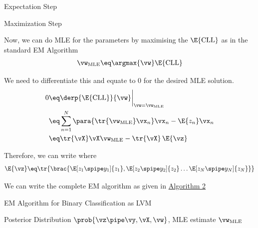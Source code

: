 \documentclass{article}
\begin{document}
\begin{question}
\begin{qsubsection}{Expectation Step}
	\end{qsubsection}

	\begin{qsubsection}{Maximization Step}

		Now, we can do MLE for the parameters by maximising the $\E{\text{CLL}}$ as in the standard EM Algorithm
		\begin{align*}
			\vw_{\text{MLE}}	&\eq	\argmax{\vw} \E{\text{CLL}} \\
		\end{align*}

		We need to differentiate this and equate to 0 for the desired MLE solution.
		\begin{align*}
			0	&\eq	\derp{\E{\text{CLL}}}{\vw} \bigg|_{\vw = \vw_{\text{MLE}}} \\
			&\eq	\sum_{n = 1}^N \para{\tr{\vw_{\text{MLE}}} \vx_n} \vx_n - \E{z_n} \vx_n \\
			&\eq	\tr{\vX} \vX \vw_{\text{MLE}} - \tr{\vX}\,\E{\vz}
		\end{align*}

		Therefore, we can write
		where
		\begin{align*}
			\E{\vz}	\eq \tr{\brac{\E[z_1 \spipe y_1]{z_1}, \E[z_2 \spipe y_2]{z_2} \dots \E[z_N \spipe y_N]{z_N}}}
		\end{align*}

	\end{qsubsection}

	We can write the complete EM algorithm as given in \hyperlink{algo:2}{Algorithm 2}

	\begin{algo}[0.9\textwidth]{EM Algorithm for Binary Classification as LVM}

		 Posterior Distribution $\prob{\vz \pipe \vy, \vX, \vw}$, MLE estimate $\vw_{\text{MLE}}$ \sbr



\end{algo}
\end{question}
\end{document}
